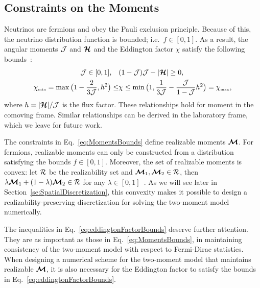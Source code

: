 \subsection{Constraints on the Moments}

Neutrinos are fermions and obey the Pauli exclusion principle.  
Because of this, the neutrino distribution function is bounded; i.e.~$f \in [0,1]$.
As a result, the angular moments $\mathcal{J}$ and $\boldsymbol{\mathcal{H}}$ and the Eddington factor $\chi$ satisfy the following bounds~\cite{levermore_1984,lareckiBanach_2011,kershaw_1976,shohatTamarkin_1943}: 
\begin{align}
\mathcal{J} \in[0,1], \quad &(1-\mathcal{J})\mathcal{J}-|\boldsymbol{\mathcal{H}}| \geq 0, \label{eq:MomentsBounds} \\
  \chi_{\mbox{\tiny min}}
  =\max\big(1-\frac{2}{3\mathcal{J}},h^{2}\big)
  \leq & \chi \leq \min\big(1,\frac{1}{3\mathcal{J}}-\frac{\mathcal{J}}{1-\mathcal{J}}h^{2}\big)=\chi_{\mbox{\tiny max}},
  \label{eq:eddingtonFactorBounds}
\end{align}
where $h = |\boldsymbol{\mathcal{H}}|/\mathcal{J}$ is the flux factor.
These relationships hold for moment in the comoving frame.
Similar relationships can be derived in the laboratory frame, which we leave for future work.

The constraints in Eq.~\eqref{eq:MomentsBounds} define realizable moments $\boldsymbol{\mathcal{M}}$.  
For fermions, realizable moments can only be constructed from a distribution satisfying the bounds $f \in [0,1]$.  
Moreover, the set of realizable moments is convex: let $\mathcal{R}$ be the realizability set and $\boldsymbol{\mathcal{M}}_{1}, \boldsymbol{\mathcal{M}}_{2} \in \mathcal{R}$, then $\lambda \boldsymbol{\mathcal{M}}_{1} + (1-\lambda)\boldsymbol{\mathcal{M}}_{2} \in \mathcal{R}$ for any $\lambda \in [0,1]$~\cite{chu_etal_2018}.
As we will see later in Section~\ref{se:SpatialDiscretization}, this convexity makes it possible to design a realizability-preserving discretization for solving the two-moment model numerically.

The inequalities in Eq.~\eqref{eq:eddingtonFactorBounds} deserve further attention.  
They are as important as those in Eq.~\eqref{eq:MomentsBounds}, in maintaining consistency of the two-moment model with respect to Fermi-Dirac statistics.  
When designing a numerical scheme for the two-moment model that maintains realizable $\boldsymbol{\mathcal{M}}$, it is also necessary for the Eddington factor to satisfy the bounds in Eq.~\eqref{eq:eddingtonFactorBounds}.  

